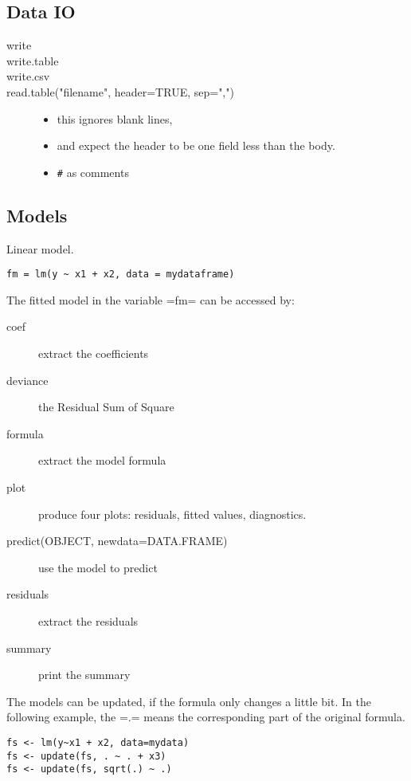 \subsection{Data IO}
\begin{description}
\item [write]
\item [write.table]
\item [write.csv]
\item [read.table("filename", header=TRUE, sep=",")]
  \begin{itemize}
  \item this ignores blank lines,
  \item and expect the header to be one field less than the body.
  \item \verb$#$ as comments
  \end{itemize}
\end{description}

\subsection{Models}
  Linear model.

\begin{lstlisting}
fm = lm(y ~ x1 + x2, data = mydataframe)
\end{lstlisting}

The fitted model in the variable =fm= can be accessed by:
\begin{description}
\item [coef] extract the coefficients
\item [deviance] the Residual Sum of Square
\item [formula] extract the model formula
\item [plot] produce four plots: residuals, fitted values, diagnostics.
\item [predict(OBJECT, newdata=DATA.FRAME)] use the model to predict
\item [residuals] extract the residuals
\item [summary] print the summary
\end{description}

The models can be updated, if the formula only changes a little bit.
In the following example, the =.= means the corresponding part of the
original formula.
\begin{lstlisting}
fs <- lm(y~x1 + x2, data=mydata)
fs <- update(fs, . ~ . + x3)
fs <- update(fs, sqrt(.) ~ .)
\end{lstlisting}


